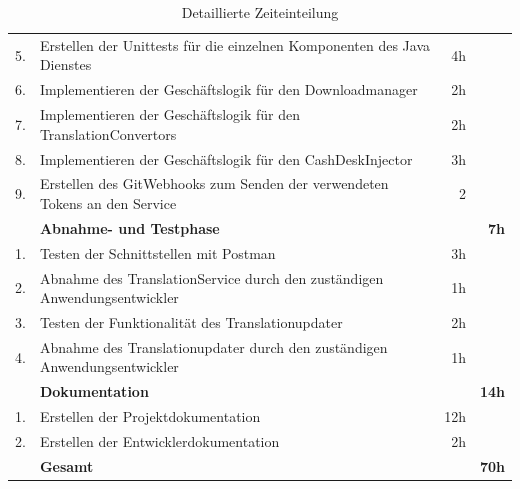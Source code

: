 \documentclass[10pt, oneside, ngerman]{article}
\begin{document}
\begin{table}[ht]
\begin{tabular}{l l  r r}
      \rowcolor{lightgray}
      5.& Erstellen der Unittests für die einzelnen Komponenten des Java Dienstes & 4h &\\
      6.& Implementieren der Geschäftslogik für den Downloadmanager & 2h  & \\
      \rowcolor{lightgray}
      7.& Implementieren der Geschäftslogik für den TranslationConvertors & 2h &\\
      8.& Implementieren der Geschäftslogik für den CashDeskInjector  & 3h&\\
      \rowcolor{lightgray}
      9.& Erstellen des GitWebhooks zum Senden der verwendeten Tokens an den Service  & 2 &\\
      \rowcolor{carolinablue}
      &\textbf{Abnahme- und Testphase} && \textbf{7h} \\ 
      \hline
      1.& Testen der Schnittstellen mit Postman & 3h &\\
      \rowcolor{lightgray}
      2.& Abnahme des TranslationService durch den zuständigen Anwendungsentwickler & 1h &\\
      3.& Testen der Funktionalität des Translationupdater & 2h &\\
      \rowcolor{lightgray}
      4.& Abnahme des Translationupdater durch den zuständigen Anwendungsentwickler & 1h &\\
      \rowcolor{carolinablue}
      &\textbf{Dokumentation} && \textbf{14h} \\
      \hline
      1.& Erstellen der Projektdokumentation &12h &\\
      \rowcolor{lightgray}
      2.& Erstellen der Entwicklerdokumentation &2h&\\
      &\textbf{Gesamt} && \textbf{70h} \\
  \end{tabular}
  \caption{Detaillierte Zeiteinteilung}
\end{table}  
\newpage
\end{document}
